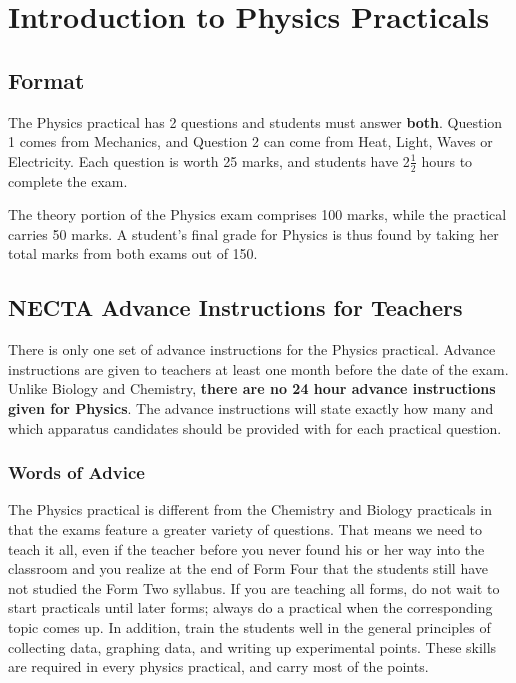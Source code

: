 \section{Introduction to Physics Practicals} \label{phy-practical-format}

\subsection{Format}
The Physics practical has 2 questions and students must answer \textbf{both}. Question 1 comes from Mechanics, and Question 2 can come from Heat, Light, Waves or Electricity. Each question is worth 25 marks, and students have 2$\frac{1}{2}$ hours to complete the exam.

The theory portion of the Physics exam comprises 100 marks, while the practical carries 50 marks. A student's final grade for Physics is thus found by taking her total marks from both exams out of 150.

\subsection{NECTA Advance Instructions for Teachers}
There is only one set of advance instructions for the Physics practical. Advance instructions are given to teachers at least one month before the date of the exam. Unlike Biology and Chemistry, \textbf{there are no 24 hour advance instructions given for Physics}.  The advance instructions will state exactly how many and which apparatus candidates should be provided with for each practical question.


\subsubsection{Words of Advice}

The Physics practical is different from the Chemistry and Biology practicals in that
the exams feature a greater variety of questions. That means we need to teach it all, even if the teacher before you never found his or her way into the classroom and you realize at the end of Form Four that the students still have not studied the Form Two syllabus. If you are teaching all forms, do not wait to start practicals until later forms; always do a practical when the corresponding topic comes up. In addition, train the students well in the general principles of collecting data, graphing data, and writing up experimental points. These skills are required in every physics practical, and carry most of the points.

